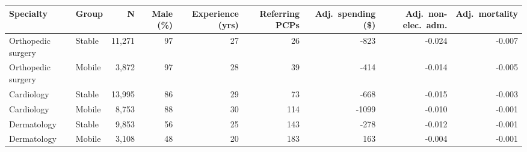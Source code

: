 
\begin{tabular}{llrrrrrrr}
\toprule
Specialty & Group & N & Male (\%) & Experience (yrs) & Referring PCPs & Adj.\ spending (\$) & Adj.\ non-elec.\ adm. & Adj.\ mortality\\
\midrule
Orthopedic surgery & Stable & 11,271 & 97 & 27 & 26 & -823 & -0.024 & -0.007\\
Orthopedic surgery & Mobile & 3,872 & 97 & 28 & 39 & -414 & -0.014 & -0.005\\
Cardiology & Stable & 13,995 & 86 & 29 & 73 & -668 & -0.015 & -0.003\\
Cardiology & Mobile & 8,753 & 88 & 30 & 114 & -1099 & -0.010 & -0.001\\
Dermatology & Stable & 9,853 & 56 & 25 & 143 & -278 & -0.012 & -0.001\\
Dermatology & Mobile & 3,108 & 48 & 20 & 183 & 163 & -0.004 & -0.001\\
\bottomrule
\end{tabular}
